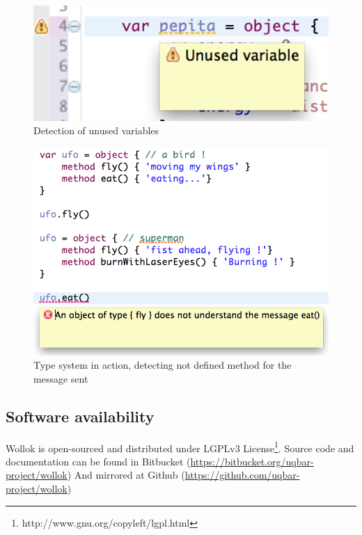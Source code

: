 \begin{figure}[ht]
    \centering
	\includegraphics[scale=0.5]{images/wollok-paper-check-unusedVariable.png}
    \caption{Detection of unused variables}
    \label{fig:check-unusedVariable.png}
\end{figure}

\begin{figure}[ht]
    \centering
	\includegraphics[scale=0.5]{images/wollok-paper-check-messageSending.png}
    \caption{Type system in action, detecting not defined method for the message sent}
    \label{fig:check-messageSending.png}
\end{figure}


\subsection{Software availability}

Wollok is open-sourced and distributed under LGPLv3 License\footnote{http://www.gnu.org/copyleft/lgpl.html}.
Source code and documentation can be found in Bitbucket (\url{https://bitbucket.org/uqbar-project/wollok}) 
And mirrored at Github (\url{https://github.com/uqbar-project/wollok})